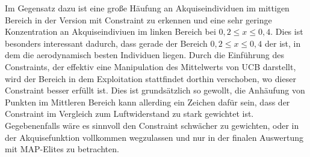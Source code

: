 Im Gegensatz dazu ist eine große Häufung an Akquiseindividuen im mittigen Bereich in der Version mit Constraint zu erkennen
und eine sehr geringe Konzentration an Akquiseindiviuen im linken Bereich bei $0,2 \leq x \leq 0,4$.
Dies ist besonders interessant dadurch, dass gerade der Bereich $0,2 \leq x \leq 0,4$ der ist, in dem die aerodynamisch besten Individuen liegen.
Durch die Einführung des Constraints, der effektiv eine Manipulation des Mittelwerts von UCB darstellt, wird der Bereich in dem Exploitation stattfindet dorthin verschoben, wo dieser Constraint besser erfüllt ist.
Dies ist grundsätzlich so gewollt, die Anhäufung von Punkten im Mittleren Bereich kann allerding ein Zeichen dafür sein, dass der Constraint im Vergleich zum Luftwiderstand zu stark gewichtet ist.
Gegebenenfalls wäre es sinnvoll den Constraint schwächer zu gewichten, oder in der Akquisefunktion vollkommen wegzulassen und nur in der finalen Auswertung mit MAP-Elites zu betrachten.

\newcommand{\wheelcasepheno}[1]{
	\begin{figure}[h]
		\centering
		\begin{minipage}{0.5\textwidth}
			\centering
			\texttt{[image: bilder/6pt1000Samples/\#1-uncon-top.png]}
			\caption{Phänotyp des Individuums (#1), oben (ohne Constraint)}
			\label{fig:wheelcasepheno#1-uncon-front}
		\end{minipage}\hfill
		\begin{minipage}{0.5\textwidth}
			\centering
			\texttt{[image: bilder/6pt1000Samples/\#1-uncon-angled.png]}
			\caption{Phänotyp des Individuums (#1), perspektivisch (ohne Constraint)}
			\label{fig:wheelcasepheno#1-uncon-angled}
		\end{minipage}
		\begin{minipage}{0.5\textwidth}
			\centering
			\texttt{[image: bilder/6pt1000Samples/\#1-con-top.png]}
			\caption{Phänotyp des Individuums (#1), oben (mit Constraint)}
			\label{fig:wheelcasepheno#1-con-front}
		\end{minipage}\hfill
		\begin{minipage}{0.5\textwidth}
			\centering
			\texttt{[image: bilder/6pt1000Samples/\#1-con-angled.png]}
			\caption{Phänotyp des Individuums (#1), perspektivisch (mit Constraint)}
			\label{fig:wheelcasepheno#1-con-angled}
		\end{minipage}
	\end{figure}
}

\newcommand{\wheelcaseref}[2]{
	fig:wheelcasepheno#1-#2
}

